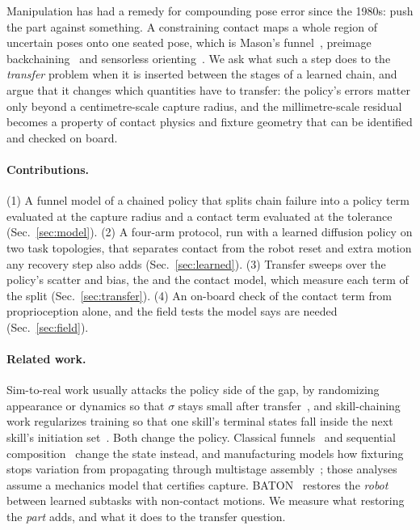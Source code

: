 \documentclass{article}
\begin{document}
Manipulation has had a remedy for compounding pose error since the 1980s: push the part against something. A
constraining contact maps a whole region of uncertain poses onto one seated pose, which is Mason's
funnel~\citep{mason1985}, preimage backchaining~\citep{lozanoperez1984} and sensorless
orienting~\citep{erdmann1988,goldberg1993}. We ask what such a step does to the \emph{transfer} problem when it
is inserted between the stages of a learned chain, and argue that it changes which quantities have to transfer:
the policy's errors matter only beyond a centimetre-scale capture radius, and the millimetre-scale residual
becomes a property of contact physics and fixture geometry that can be identified and checked on board.

\paragraph{Contributions.}
(1) A funnel model of a chained policy that splits chain failure into a policy term evaluated at the capture
radius and a contact term evaluated at the tolerance (Sec.~\ref{sec:model}). (2) A four-arm protocol, run with a
learned diffusion policy on two task topologies, that separates contact from the robot reset and extra motion any
recovery step also adds (Sec.~\ref{sec:learned}). (3) Transfer sweeps over the policy's scatter and bias, the
and the contact model, which measure each term of the split (Sec.~\ref{sec:transfer}). (4) An
on-board check of the contact term from proprioception alone, and the field tests the model says are needed
(Sec.~\ref{sec:field}).

\paragraph{Related work.} Sim-to-real work usually attacks the policy side of the gap, by randomizing appearance or
dynamics so that $\sigma$ stays small after transfer~\citep{tobin2017,peng2018}, and skill-chaining work regularizes
training so that one skill's terminal states fall inside the next skill's initiation set~\citep{lee2021,scar2024}.
Both change the policy. Classical funnels~\citep{mason1985,lozanoperez1984,erdmann1988,peshkin1988,goldberg1993} and
sequential composition~\citep{burridge1999} change the state instead, and manufacturing models how fixturing stops
variation from propagating through multistage assembly~\citep{jinshi1999,shi2006}; those analyses assume a
mechanics model that certifies capture. BATON~\citep{baton2026} restores the \emph{robot} between learned subtasks with
non-contact motions. We measure what restoring the \emph{part} adds, and what it does to the transfer question.
\end{document}
